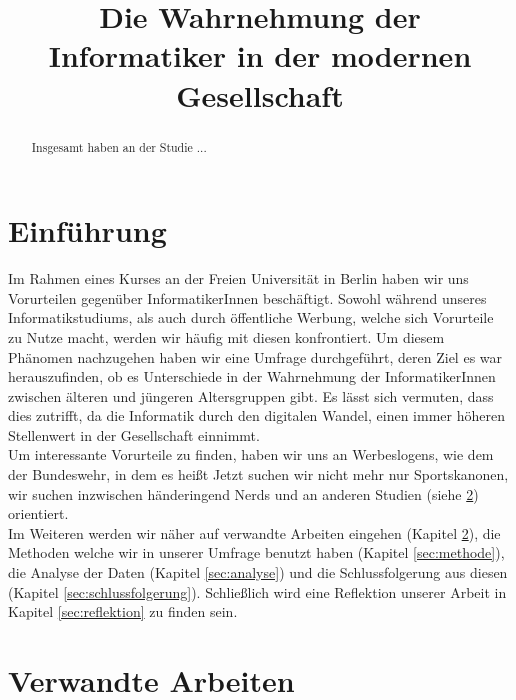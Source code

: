 \documentclass[de]{agse-empir-report}\usepackage[]{graphicx}\usepackage[]{color}
\begin{document}
\title{Die Wahrnehmung der Informatiker in der modernen Gesellschaft}
\author{
    \and
    \and
}

\maketitle


\begin{abstract}
    Insgesamt haben an der Studie ...
\end{abstract}


\section[jk]{Einführung}

Im Rahmen eines Kurses an der Freien Universität in Berlin haben wir uns Vorurteilen gegenüber InformatikerInnen beschäftigt. Sowohl während unseres Informatikstudiums, als auch durch öffentliche Werbung, welche sich Vorurteile zu Nutze macht, werden wir häufig mit diesen konfrontiert.
Um diesem Phänomen nachzugehen haben wir eine Umfrage durchgeführt, deren Ziel es war herauszufinden, ob es Unterschiede in der Wahrnehmung der InformatikerInnen zwischen älteren und jüngeren Altersgruppen gibt. Es lässt sich vermuten, dass dies zutrifft, da die Informatik durch den digitalen Wandel, einen immer höheren Stellenwert in der Gesellschaft einnimmt.\\
Um interessante Vorurteile zu finden, haben wir uns an Werbeslogens, wie dem der Bundeswehr, in dem es heißt \glqq Jetzt suchen wir nicht mehr nur Sportskanonen, wir suchen inzwischen händeringend Nerds \grqq \cite{Bundeswehr} und an anderen Studien (siehe \ref{sec:verwandteArbeiten}) orientiert. \\
Im Weiteren werden wir näher auf verwandte Arbeiten eingehen (Kapitel \ref{sec:verwandteArbeiten}), die Methoden welche wir in unserer Umfrage benutzt haben (Kapitel \ref{sec:methode}), die Analyse der Daten (Kapitel \ref{sec:analyse}) und die Schlussfolgerung aus diesen (Kapitel \ref{sec:schlussfolgerung}). Schließlich wird eine Reflektion unserer Arbeit in Kapitel \ref{sec:reflektion} zu finden sein.

\section[]{Verwandte Arbeiten}\label{sec:verwandteArbeiten}
\end{document}
